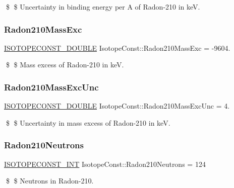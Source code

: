 \$ \$ Uncertainty in binding energy per A of Radon-\/210 in keV. \mbox{\label{group___isotope_const-_radon-_rn210_gab7e46c2aaa0c768fef832b0ef583331c}} 
\subsubsection{\texorpdfstring{Radon210\+Mass\+Exc}{Radon210MassExc}}
{\footnotesize\ttfamily \mbox{\hyperlink{group___isotope_const-_macros_ga8f45a7272ce02c0b4c65c44636ed719a}{I\+S\+O\+T\+O\+P\+E\+C\+O\+N\+S\+T\+\_\+\+D\+O\+U\+B\+LE}} Isotope\+Const\+::\+Radon210\+Mass\+Exc = -\/9604.}

\$ \$ Mass excess of Radon-\/210 in keV. \mbox{\label{group___isotope_const-_radon-_rn210_ga9b8401af4cc4609cd42efcde1ac6f654}} 
\subsubsection{\texorpdfstring{Radon210\+Mass\+Exc\+Unc}{Radon210MassExcUnc}}
{\footnotesize\ttfamily \mbox{\hyperlink{group___isotope_const-_macros_ga8f45a7272ce02c0b4c65c44636ed719a}{I\+S\+O\+T\+O\+P\+E\+C\+O\+N\+S\+T\+\_\+\+D\+O\+U\+B\+LE}} Isotope\+Const\+::\+Radon210\+Mass\+Exc\+Unc = 4.}

\$ \$ Uncertainty in mass excess of Radon-\/210 in keV. \mbox{\label{group___isotope_const-_radon-_rn210_ga1f4277d8526926854a6b7b33add24718}} 
\subsubsection{\texorpdfstring{Radon210\+Neutrons}{Radon210Neutrons}}
{\footnotesize\ttfamily \mbox{\hyperlink{group___isotope_const-_macros_ga5f18360b3e99483a35c32d789e62621c}{I\+S\+O\+T\+O\+P\+E\+C\+O\+N\+S\+T\+\_\+\+I\+NT}} Isotope\+Const\+::\+Radon210\+Neutrons = 124}

\$ \$ Neutrons in Radon-\/210. \mbox{\label{group___isotope_const-_radon-_rn210_ga9534208da011e16996952a3e008a364a}} 
